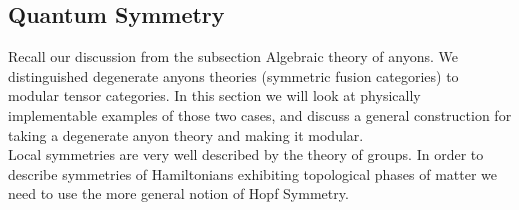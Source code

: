 \documentclass{article}
\begin{document}

\subsection{Quantum Symmetry}
Recall our discussion from the subsection Algebraic theory of anyons. We distinguished degenerate anyons theories (symmetric fusion categories) to modular tensor categories. In this section we will look at physically implementable examples of those two cases, and discuss a general construction for taking a degenerate anyon theory and making it modular.\\
Local symmetries are very well described by the theory of groups. In order to describe symmetries of Hamiltonians exhibiting topological phases of matter we need to use the more general notion of Hopf Symmetry.
\end{document}
